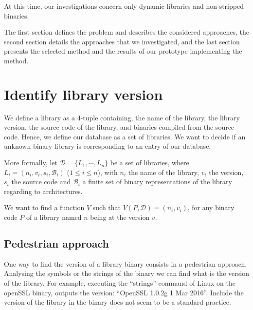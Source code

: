 \documentclass{article}
\begin{document}
    At this time, our investigations concern only dynamic libraries and non-stripped binaries.
    
    The first section defines the problem and describes the considered
    approaches, the second section details the approaches that we investigated, and the last section presents the selected method and the results of our prototype implementing the method.
    


   \section{Identify library version}
   


   We define a library as a $4$-tuple containing, the name of the
   library, the library version, the source code of the library, and binaries
   compiled from the source code. Hence, we define our database as a set of libraries. We want to decide if an unknown binary library is corresponding to an entry of our database.

   More formally, let $\mathcal{D} = \{ L_1, \cdots, L_n\}$ be a set of libraries, where
   $L_i = (n_i, v_i, s_i, \mathcal{B}_i)$ ($1 \le i \le n$), with $n_i$ the name of the library,
   $v_i$ the version, $s_i$ the source code and $\mathcal{B}_i$ a finite set of
   binary representations of the library regarding to architectures.

  We want to find a function $V$ such that $V(P,\mathcal{D}) = (n_i,
   v_i)$, for any binary code $P$ of a library named $n$ being at the version $v$. 
   

	\subsection{Pedestrian approach}
    
	One way to find the version of a library binary consists in a pedestrian approach. Analysing the symbols or the strings of the binary we can find what is the version of the library. For example, executing the ``strings'' command of Linux on the openSSL binary, outputs the version: ``OpenSSL 1.0.2g  1 Mar 2016''. Include the version of the library in the binary does not seem to be a standard practice.

\end{document}
